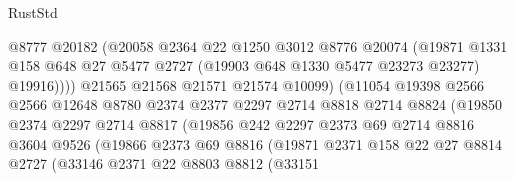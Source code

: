 \begin{lexlean}{RustStd}
\begin{coremodule}
                                @8777
                                @20182
                                (@20058
                                  @2364
                                  @22
                                  @1250
                                  @3012
                                  @8776
                                  @20074
                                  (@19871
                                    @1331
                                    @158
                                    @648
                                    @27
                                    @5477
                                    @2727
                                    (@19903 @648 @1330 @5477 @23273 @23277)
                                    @19916))))
                            @21565
                            @21568
                            @21571
                            @21574
                            @10099)
                          (@11054
                            @19398
                            @2566
                            @2566
                            @12648
                            @8780
                            @2374
                            @2377
                            @2297
                            @2714
                            @8818
                            @2714
                            @8824
                            (@19850
                              @2374
                              @2297
                              @2714
                              @8817
                              (@19856
                                @242
                                @2297
                                @2373
                                @69
                                @2714
                                @8816
                                @3604
                                @9526
                                (@19866
                                  @2373
                                  @69
                                  @8816
                                  (@19871
                                    @2371
                                    @158
                                    @22
                                    @27
                                    @8814
                                    @2727
                                    (@33146
                                      @2371
                                      @22
                                      @8803
                                      @8812
                                      (@33151

\end{coremodule}
\end{lexlean}
